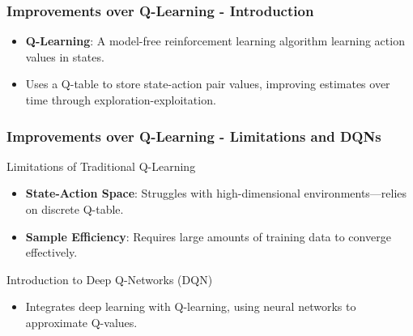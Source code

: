 \documentclass[aspectratio=169]{beamer}
\begin{document}
\begin{frame}[fragile]
    \frametitle{Improvements over Q-Learning - Introduction}
    \begin{itemize}
        \item \textbf{Q-Learning}: A model-free reinforcement learning algorithm learning action values in states.
        \item Uses a Q-table to store state-action pair values, improving estimates over time through exploration-exploitation.
    \end{itemize}
\end{frame}

\begin{frame}[fragile]
    \frametitle{Improvements over Q-Learning - Limitations and DQNs}
    \begin{block}{Limitations of Traditional Q-Learning}
        \begin{itemize}
            \item \textbf{State-Action Space}: Struggles with high-dimensional environments—relies on discrete Q-table.
            \item \textbf{Sample Efficiency}: Requires large amounts of training data to converge effectively.
        \end{itemize}
    \end{block}

    \begin{block}{Introduction to Deep Q-Networks (DQN)}
        \begin{itemize}
            \item Integrates deep learning with Q-learning, using neural networks to approximate Q-values.
        \end{itemize}
    \end{block}
\end{frame}
\end{document}
